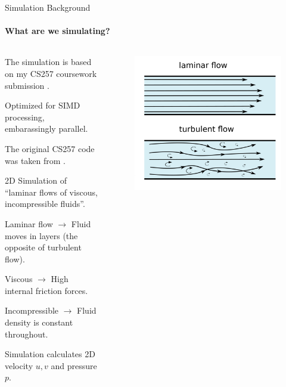 \begin{frame}{Simulation Background}
    \framesubtitle{What are we simulating?}
    
    \begin{columns}[t, onlytextwidth]
        \begin{column}{0.7\textwidth}
            \begin{wideitemize}
                \item The simulation is based on my CS257 coursework submission \parencite{modules:aca257submission}.
                \begin{wideitemize}
                    \item Optimized for SIMD processing, embarassingly parallel.
                \end{wideitemize}
                \item The original CS257 code was taken from \parencite{book:griebel1998numerical}.
                \item 2D Simulation of ``laminar flows of viscous, incompressible fluids''.
                \begin{wideitemize}
                    \item Laminar flow $\rightarrow$ Fluid moves in layers (the opposite of turbulent flow).
                    \item Viscous $\rightarrow$ High internal friction forces.
                    \item Incompressible $\rightarrow$ Fluid density is constant throughout.
                \end{wideitemize}
                \item Simulation calculates {2D velocity $u,v$ and pressure $p$}.
            \end{wideitemize}
        \end{column} 
        \begin{column}{0.3\textwidth}
            \begin{figure}
                \includegraphics[width=\textwidth]{Presentation/images/sketch-laminar-flow-turbulent-flow.png}

\end{figure}
\end{column}
\end{columns}
\end{frame}
